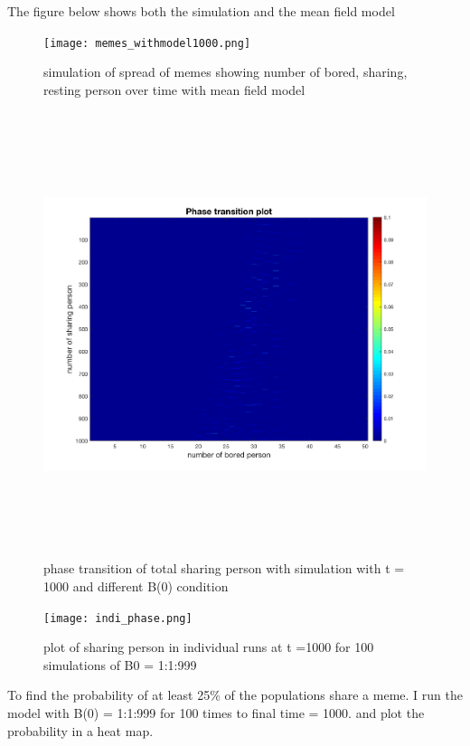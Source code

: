\documentclass[12pt]{article}
\begin{document}
{The figure below shows both the simulation and the mean field model
\begin{figure}[H] %
\centering
\texttt{[image: memes\_withmodel1000.png]}
\caption{simulation of spread of memes showing number of bored, sharing, resting person over time with mean field model}
\label{fig:meme_sim_model}
\end{figure}

\begin{figure}[H] %
\centering
\includegraphics[width = 16 cm, height = 13cm]{phasetransition.png}
\caption{phase transition of total sharing person with simulation with t = 1000 and different B(0) condition}
\label{fig:meme_phase_transition_1}
\end{figure}

\begin{figure}[H] %
\centering
\texttt{[image: indi\_phase.png]}
\caption{plot of sharing person in individual runs at t =1000 for 100 simulations of B0 = 1:1:999}
\label{fig:meme_phase_transition_indi}
\end{figure}

To find the probability of at least 25\% of the populations share a meme. I run the model with B(0) = 1:1:999 for 100 times to final time = 1000. and plot the probability in a heat map. 

}
\end{document}

